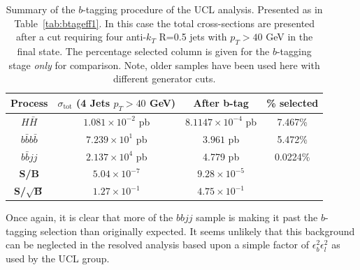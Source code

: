 \documentclass[12pt]{article}
\begin{document}
\begin{table}[h]
\begin{center}
\begin{tabular}{|c|c|c|c|}
\hline
Process & $\sigma_{\mathrm{tot}}$ (4 Jets $p_T>40$ GeV) & After b-tag & \% selected  \\
\hline \hline
$H\bar{H}$ & $1.081 \times 10^{-2}$ pb & $8.1147\times 10^{-4}$ pb & 7.467\% \\
\hline
$b\bar{b}b\bar{b}$ & $7.239 \times10^1$ pb & $3.961$ pb & 5.472\% \\
$b\bar{b}jj$ &  $2.137 \times 10^4$ pb & 4.779 pb & 0.0224\% \\
\hline
\textbf{S/B} & $5.04 \times 10^{-7}$ & $9.28 \times 10^{-5}$& \multicolumn{1}{c}{}\\
\cline{1-3}
\textbf{S/$\sqrt{\mathrm{\textbf{B}}}$}& $1.27 \times 10^{-1}$ & $4.75 \times 10^{-1}$& \multicolumn{1}{c}{}\\
\cline{1-3}
\end{tabular}
\end{center}
\caption{Summary of the $b$-tagging procedure of the UCL analysis. Presented as in Table~\ref{tab:btageff1}. In this case the total cross-sections are presented after a cut requiring four anti-$k_T$ R=0.5 jets with $p_T>40$ GeV in the final state. The percentage selected column is given for the $b$-tagging stage \emph{only} for comparison. Note, older samples have been used here with different generator cuts.}\label{tab:UCLbtag}
\end{table}%

Once again, it is clear that more of the $bbjj$ sample is making it past the $b$-tagging selection than originally expected. It seems unlikely that this background can be neglected in the resolved analysis based upon a simple factor of $\epsilon_b^{2}\epsilon_l^{2}$ as used by the UCL group.
\end{document}
